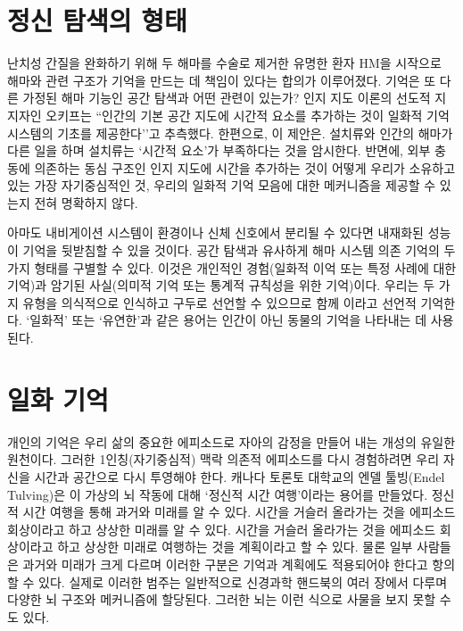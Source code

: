 \documentclass[openany]{book}
\begin{document}
\begin{appendices}
\section{정신 탐색의 형태}
난치성 간질을 완화하기 위해 두 해마를 수술로 제거한 유명한 환자 HM을 시작으로 해마와 관련 구조가 기억을 만드는 데 책임이 있다는 합의가 이루어졌다. 기억은 또 다른 가정된 해마 기능인 공간 탐색과 어떤 관련이 있는가? 인지 지도 이론의 선도적 지지자인 오키프는 ``인간의 기본 공간 지도에 시간적 요소를 추가하는 것이 일화적 기억 시스템의 기초를 제공한다’’고 추측했다. 한편으로, 이 제안은. 설치류와 인간의 해마가 다른 일을 하며 설치류는 `시간적 요소’가 부족하다는 것을 암시한다. 반면에, 외부 충동에 의존하는 동심 구조인 인지 지도에 시간을 추가하는 것이 어떻게 우리가 소유하고 있는 가장 자기중심적인 것, 우리의 일화적 기억 모음에 대한 메커니즘을 제공할 수 있는지 전혀 명확하지 않다.

아마도 내비게이션 시스템이 환경이나 신체 신호에서 분리될 수 있다면 내재화된 성능이 기억을 뒷받침할 수 있을 것이다. 공간 탐색과 유사하게 해마 시스템 의존 기억의 두 가지 형태를 구별할 수 있다. 이것은 개인적인 경험(일화적 이억 또는 특정 사례에 대한 기억)과 암기된 사실(의미적 기억 또는 통계적 규칙성을 위한 기억)이다. 우리는 두 가지 유형을 의식적으로 인식하고 구두로 선언할 수 있으므로 함께 이라고 선언적 기억한다. `일화적’ 또는 `유연한’과 같은 용어는 인간이 아닌 동물의 기억을 나타내는 데 사용된다.

\section{일화 기억}
개인의 기억은 우리 삶의 중요한 에피소드로 자아의 감정을 만들어 내는 개성의 유일한 원천이다. 그러한 1인칭(자기중심적) 맥락 의존적 에피소드를 다시 경험하려면 우리 자신을 시간과 공간으로 다시 투영해야 한다. 캐나다 토론토 대학교의 엔델 툴빙(Endel Tulving)은 이 가상의 뇌 작동에 대해 `정신적 시간 여행’이라는 용어를 만들었다. 정신적 시간 여행을 통해 과거와 미래를 알 수 있다. 시간을 거슬러 올라가는 것을 에피소드 회상이라고 하고 상상한 미래를 알 수 있다. 시간을 거슬러 올라가는 것을 에피소드 회상이라고 하고 상상한 미래로 여행하는 것을 계획이라고 할 수 있다. 물론 일부 사람들은 과거와 미래가 크게 다르며 이러한 구분은 기억과 계획에도 적용되어야 한다고 항의할 수 있다. 실제로 이러한 범주는 일반적으로 신경과학 핸드북의 여러 장에서 다루며 다양한 뇌 구조와 메커니즘에 할당된다. 그러한 뇌는 이런 식으로 사물을 보지 못할 수도 있다.


\end{appendices}
\end{document}
